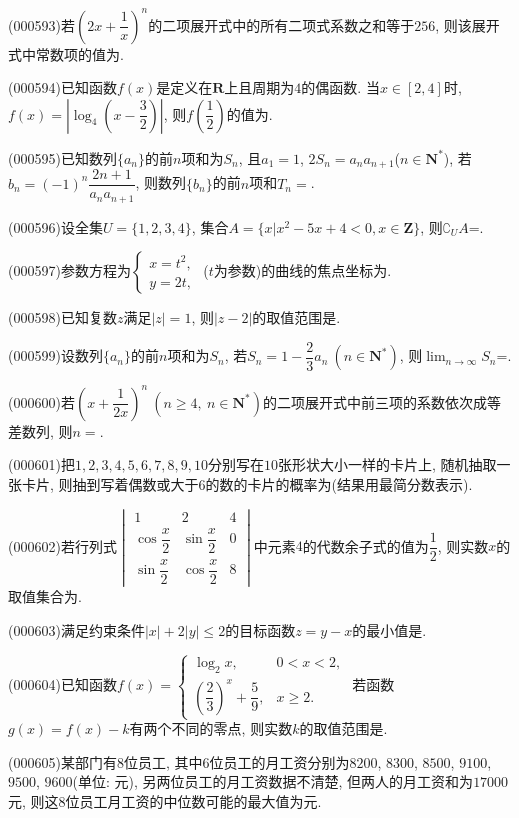 \item (000593)若$(2x+\dfrac 1x)^n$的二项展开式中的所有二项式系数之和等于$256$, 则该展开式中常数项的值为.
\item (000594)已知函数$f(x)$是定义在$\mathbf{R}$上且周期为$4$的偶函数. 当$x\in [2,4]$时, $f(x)=\left|\log_4(x-\dfrac32)\right|$, 则$f(\dfrac12)$的值为.
\item (000595)已知数列$\{a_n\}$的前$n$项和为$S_n$, 且$a_1=1$, $2S_n=a_na_{n+1}$($n\in \mathbf{N}^*$), 若$b_n=(-1)^n\dfrac{2n+1}{{a_n}{a_{n+1}}}$, 则数列$\{b_n\}$的前$n$项和$T_n=$.
\item (000596)设全集$U=\{1,2,3,4\}$, 集合$A=\{x|x^2-5x+4<0,x\in \mathbf{Z}\}$, 则$\complement_U A$=.
\item (000597)参数方程为$\begin{cases} x=t^2, \\ y=2t, \end{cases}$ ($t$为参数)的曲线的焦点坐标为.
\item (000598)已知复数$z$满足$|z|=1$, 则$|z-2|$的取值范围是.
\item (000599)设数列$\{a_n\}$的前$n$项和为$S_n$, 若$S_n=1-\dfrac23{a_n} \ (n\in \mathbf{N}^*)$, 则$\displaystyle\lim_{n\to\infty}S_n$=.
\item (000600)若$(x+\dfrac1{2x})^n \ (n\ge 4, \ n\in \mathbf{N}^*)$的二项展开式中前三项的系数依次成等差数列, 则$n=$.
\item (000601)把$1,2,3,4,5,6,7,8,9,10$分别写在$10$张形状大小一样的卡片上, 随机抽取一张卡片, 则抽到写着偶数或大于$6$的数的卡片的概率为(结果用最简分数表示).
\item (000602)若行列式$\begin{vmatrix} 1 & 2 & 4 \\ \cos \dfrac x2 & \sin \dfrac x2 & 0 \\ \sin \dfrac x2 & \cos \dfrac x2 & 8 \end{vmatrix}$中元素$4$的代数余子式的值为$\dfrac12$, 则实数$x$的取值集合为.
\item (000603)满足约束条件$|x|+2|y|\le 2$的目标函数$z=y-x$的最小值是.
\item (000604)已知函数$f(x)=\begin{cases} \log_2 x, & 0<x<2, \\ (\dfrac23)^x+\dfrac59, & x\ge 2. \end{cases}$ 若函数$g(x)=f(x)-k$有两个不同的零点, 则实数$k$的取值范围是.
\item (000605)某部门有$8$位员工, 其中$6$位员工的月工资分别为$8200$, $8300$, $8500$, $9100$, $9500$, $9600$(单位: 元), 另两位员工的月工资数据不清楚, 但两人的月工资和为$17000$元, 则这$8$位员工月工资的中位数可能的最大值为元.
